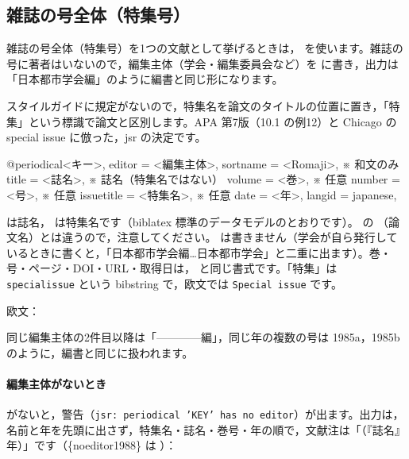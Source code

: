 
\subsection{雑誌の号全体（特集号）}\label{sec:periodical}
雑誌の号全体（特集号）を1つの文献として挙げるときは， を使います。雑誌の号に著者はいないので，編集主体（学会・編集委員会など）を  に書き，出力は「日本都市学会編」のように編書と同じ形になります。

スタイルガイドに規定がないので，特集名を論文のタイトルの位置に置き，「特集」という標識で論文と区別します。APA 第7版（10.1 の例12）と Chicago の special issue に倣った，jsr の決定です。

\begin{bibtemplate}
@periodical{<キー>,
  editor     = {{<編集主体>}},
  sortname   = {{<Romaji>}},     ※ 和文のみ
  title      = {<誌名>},         ※ 誌名（特集名ではない）
  volume     = {<巻>},           ※ 任意
  number     = {<号>},           ※ 任意
  issuetitle = {<特集名>},       ※ 任意
  date       = {<年>},
  langid     = {japanese},
}
\end{bibtemplate}

 は誌名， は特集名です（biblatex 標準のデータモデルのとおりです）。 の （論文名）とは違うので，注意してください。 は書きません（学会が自ら発行しているときに書くと，「日本都市学会編…日本都市学会」と二重に出ます）。巻・号・ページ・DOI・URL・取得日は， と同じ書式です。「特集」は \texttt{specialissue} という bibstring で，欧文では \texttt{Special issue} です。


\noindent 欧文：


同じ編集主体の2件目以降は「————編」，同じ年の複数の号は 1985a，1985b のように，編書と同じに扱われます。

\paragraph{編集主体がないとき}
 がないと，警告（\texttt{jsr: periodical 'KEY' has no editor}）が出ます。出力は，名前と年を先頭に出さず，特集名・誌名・巻号・年の順で，文献注は「（『誌名』年）」です（\{noeditor1988\} は {\parencite{noeditor1988}}）：

